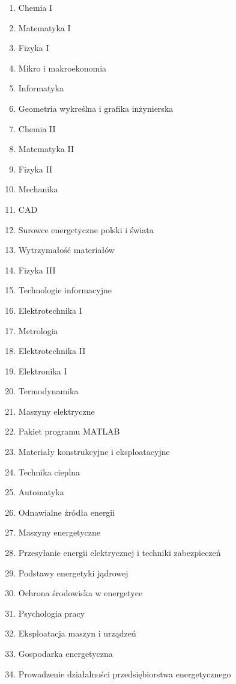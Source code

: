 \documentclass[a4paper,12pt]{article}
\begin{document}
\begin{multicols}{2}
\begin{enumerate}
\item Chemia I
\item Matematyka I
\item Fizyka I
\item Mikro i makroekonomia 
\item Informatyka
\item Geometria wykreślna i grafika inżynierska
\item Chemia II
\item Matematyka II
\item Fizyka II
\item Mechanika
\item CAD
\item Surowce energetyczne polski i świata
\item Wytrzymałość materiałów
\item Fizyka III
\item Technologie informacyjne
\item Elektrotechnika I
\item Metrologia
\item Elektrotechnika II
\item Elektronika I
\item Termodynamika
\item Maszyny elektryczne
\item Pakiet programu MATLAB
\item Materiały konstrukcyjne i eksploatacyjne
\item Technika cieplna
\item Automatyka
\item Odnawialne źródła energii
\item Maszyny energetyczne
\item Przesyłanie energii elektrycznej i techniki zabezpieczeń
\item Podstawy energetyki jądrowej
\item Ochrona środowiska w energetyce
\item Psychologia pracy
\item Eksploatacja maszyn i urządzeń
\item Gospodarka energetyczna
\item Prowadzenie działalności przedsiębiorstwa energetycznego
\end{enumerate}
\end{multicols}
\end{document}
